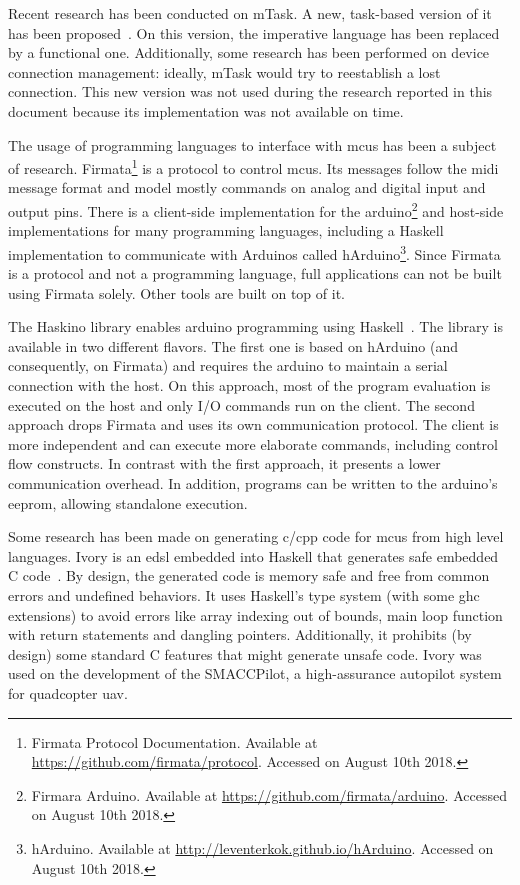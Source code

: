 Recent research has been conducted on \gls{mTask}. A new, task-based version of it has been proposed~\cite{micro}. On this version, the imperative language has been replaced by a functional one. Additionally, some research has been performed on device connection management: ideally, \gls{mTask} would try to reestablish a lost connection. This new version was not used during the research reported in this document because its implementation was not available on time.

The usage of programming languages to interface with \glspl{mcu} has been a subject of research. Firmata\footnote{Firmata Protocol Documentation. Available at \url{https://github.com/firmata/protocol}. Accessed on August 10th 2018.} is a protocol to control \glspl{mcu}. Its messages follow the \acs{midi} message format and model mostly commands on analog and digital input and output pins. There is a client-side implementation for the \gls{arduino}\footnote{Firmara Arduino. Available at \url{https://github.com/firmata/arduino}. Accessed on August 10th 2018.} and host-side implementations for many programming languages, including a Haskell implementation to communicate with Arduinos called hArduino\footnote{hArduino. Available at \url{http://leventerkok.github.io/hArduino}. Accessed on August 10th 2018.}. Since Firmata is a protocol and not a programming language, full applications can not be built using Firmata solely. Other tools are built on top of it.

The Haskino library enables \gls{arduino} programming using Haskell~\cite{haskino}. The library is available in two different flavors. The first one is based on hArduino (and consequently, on Firmata) and requires the \gls{arduino} to maintain a serial connection with the host. On this approach, most of the program evaluation is executed on the host and only I/O commands run on the client. The second approach drops Firmata and uses its own communication protocol. The client is more independent and can execute more elaborate commands, including control flow constructs. In contrast with the first approach, it presents a lower communication overhead. In addition, programs can be written to the \gls{arduino}'s \acs{eeprom}, allowing standalone execution.

Some research has been made on generating \gls{c}/\gls{cpp} code for \glspl{mcu} from high level languages. Ivory is an \ac{edsl} embedded into Haskell that generates safe embedded C code~\cite{ivory1,ivory2}. By design, the generated code is memory safe and free from common errors and undefined behaviors. It uses Haskell's type system (with some \acs{ghc} extensions) to avoid errors like array indexing out of bounds, main loop function with return statements and dangling pointers. Additionally, it prohibits (by design) some standard C features that might generate unsafe code. Ivory was used on the development of the SMACCPilot, a high-assurance autopilot system for quadcopter \ac{uav}.

